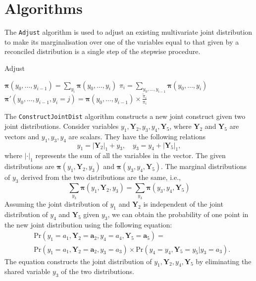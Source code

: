 \documentclass[a4paper,review,12pt,authoryear]{elsarticle}
\let\code=\texttt
\newcommand{\bY}{\mathbf{Y}}
\newcommand{\bpi}{\bm{\pi}}
\begin{document}
\newpage

\appendix

\section{Algorithms}
\label{appendix:adjust}

The \code{Adjust} algorithm is used to adjust an existing multivariate joint distribution to make its marginalisation over one of the variables equal to that given by a reconciled distribution is a single step of the stepwise procedure.

\begin{algorithm}[H]
  \label{alg:adjust}
  \caption{Adjust}
  \Input{$\bpi(y_0,y_1,\dots,y_i), \tilde\pi_i, y_i \in \{0,1,\dots,k_i\}$}

  $\bpi(y_0,\dots,y_{i-1}) = \sum_{y_i}\bpi(y_0,\dots,y_i)$\;
  $\pi_i = \sum_{y_0,\dots,y_{i-1}}\bpi(y_0,\dots,y_i)$ \;
   {
    $\bpi'(y_0,\dots,y_{i-1}, y_i=j) = \bpi(y_0,\dots,y_{i-1}) \times \frac{\tilde\pi_i}{\pi_i}$ \;
  }

  \Output{$\bpi'(y_0,\dots,y_i)$}
  
 \end{algorithm}


 The \code{ConstructJointDist} algorithm constructs a new joint construct given two joint distributions. 
 Consider variables $y_1, \bY_2, y_3, y_4, \bY_5$, where $\bY_2$ and $\bY_5$ are vectors and $y_1, y_3, y_4$ are scalars. 
 They have the following relations
 \[
  y_1 = |\bY_2|_1 + y_3, \quad y_3 = y_4 + |\bY_5|_1,
 \]
 where $|\cdot|_1$ represents the sum of all the variables in the vector.
 The given distributions are $\bpi(y_1, \bY_2, y_3)$ and $\bpi(y_3, y_4, \bY_5)$.
 The marginal distributions of $y_3$ derived from the two distributions are the same, i.e.,
 \[
  \sum_{y_3} \bpi(y_1, \bY_2, y_3) = \sum_{y_3}\bpi(y_3, y_4, \bY_5)
\]
 Assuming the joint distribution of $y_1$ and $\bY_2$ is independent of the joint distribution of $y_4$ and $\bY_5$ given $y_3$, we can obtain the probability of one point in the new joint distribution using the following equation: \[
   \begin{aligned}
  &\text{Pr}(y_1=a_1,\bY_2=\mathbf{a}_2, y_4=a_4, \bY_5 = \mathbf{a}_5) =\\ &\text{Pr} (y_1=a_1,\bY_2=\mathbf{a}_2,y_3=a_3) \times \text{Pr}(y_4=y_4,\bY_5=y_5|y_3=a_3).
   \end{aligned}
 \]
 The equation constructs the joint distribution of $y_1, \bY_2, y_4, \bY_5$ by eliminating the shared variable $y_3$ of the two distributions.

\newpage



\end{document}
